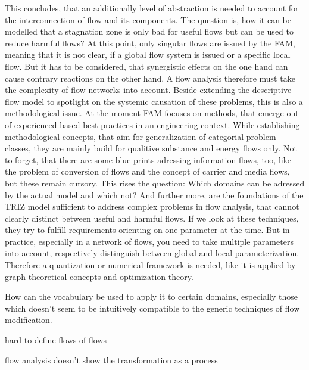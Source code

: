 \documentclass[a4paper,11pt]{article}
\begin{document}
\begin{itemize}
        This concludes, that an additionally level of abstraction is needed to account for the interconnection of flow and its components. The question
        is, how it can be modelled that a stagnation zone is only bad for useful flows but can be used to reduce harmful flows?
        At this point, only singular flows are issued by the FAM, meaning that it is not clear, if a global flow system is issued or a specific local flow.
        But it has to be considered, that synergistic effects on the one hand can cause contrary reactions on the other hand. A flow analysis therefore must 
        take the complexity of flow networks into account. Beside extending the descriptive flow model to spotlight on the systemic causation of these problems, 
        this is also a methodological issue. At the moment FAM focuses on methods, that emerge out of experienced based best practices in an engineering context.
        While establishing methodological concepts, that aim for generalization of categorial problem classes,
        they are mainly build for qualitive substance and energy flows only. Not to forget, that there are some blue prints adressing information flows, too, like
        the problem of conversion of flows and the concept of carrier and media flows, but these remain cursory.
        This rises the question: Which domains can be adressed by the actual model and which not? And further more, are the foundations of the TRIZ model sufficient to address complex problems in flow analysis, that cannot clearly distinct between
        useful and harmful flows. If we look at these techniques, they try to fulfill requirements orienting on one parameter at the time.
        But in practice, especially in a network of flows, you need to take multiple parameters into account, respectively distinguish between global and local
        parameterization. Therefore a quantization or numerical framework is needed, like it is applied by graph theoretical concepts and optimization theory. 
        
         



         

        How can the vocabulary be used to apply it to certain domains, especially those which doesn't seem to be intuitively compatible to the generic techniques
        of flow modification. 


        hard to define flows of flows

        flow analysis doesn't show the transformation as a process


\end{itemize}
\end{document}
